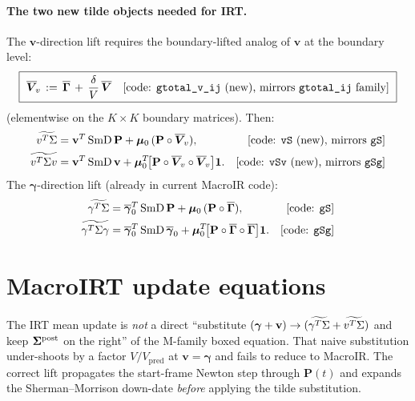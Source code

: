 \documentclass[11pt]{article}
\begin{document}
\paragraph{The two new tilde objects needed for IRT.}
The $\mathbf{v}$-direction lift requires the boundary-lifted analog of
$\mathbf{v}$ at the boundary level:
\begin{equation}
  \boxed{\
  \overline{\boldsymbol{V}}_{\!v} \,:=\, \overline{\boldsymbol{\Gamma}} \,+\, \frac{\delta}{V}\,\overline{\boldsymbol{V}}
  \quad\text{[code: \texttt{gtotal\_v\_ij} (new), mirrors \texttt{gtotal\_ij} family]}
  \ }
\end{equation}
(elementwise on the $K\!\times\! K$ boundary matrices). Then:
\begin{align}
  \widetilde{v^{T}\Sigma}
  &= \mathbf{v}^{T}\,\mathrm{SmD}\,\mathbf{P}
   + \boldsymbol{\mu}_0\,(\mathbf{P}\circ\overline{\boldsymbol{V}}_{\!v}),
   &\text{[code: \texttt{vS} (new), mirrors \texttt{gS}]}
   \label{eq:tilde_v_vec}\\
  \widetilde{v^{T}\Sigma v}
  &= \mathbf{v}^{T}\,\mathrm{SmD}\,\mathbf{v}
   + \boldsymbol{\mu}_0^{T}\!\bigl[\mathbf{P}\circ\overline{\boldsymbol{V}}_{\!v}\circ\overline{\boldsymbol{V}}_{\!v}\bigr]\mathbf{1}.
   &\text{[code: \texttt{vSv} (new), mirrors \texttt{gSg}]}
   \label{eq:tilde_v_v}
\end{align}
The $\boldsymbol{\gamma}$-direction lift (already in current MacroIR code):
\begin{align}
  \widetilde{\gamma^{T}\Sigma}
  &= \overline{\boldsymbol{\gamma}}_0^{T}\,\mathrm{SmD}\,\mathbf{P}
   + \boldsymbol{\mu}_0\,(\mathbf{P}\circ\overline{\boldsymbol{\Gamma}}),
   &\text{[code: \texttt{gS}]}\\
  \widetilde{\gamma^{T}\Sigma\gamma}
  &= \overline{\boldsymbol{\gamma}}_0^{T}\,\mathrm{SmD}\,\overline{\boldsymbol{\gamma}}_0
   + \boldsymbol{\mu}_0^{T}\!\bigl[\mathbf{P}\circ\overline{\boldsymbol{\Gamma}}\circ\overline{\boldsymbol{\Gamma}}\bigr]\mathbf{1}.
   &\text{[code: \texttt{gSg}]}
\end{align}

\section{MacroIRT update equations}

The IRT mean update is \emph{not} a direct ``substitute $(\boldsymbol{\gamma}+\mathbf{v}) \to (\widetilde{\gamma^{T}\Sigma} + \widetilde{v^{T}\Sigma})$ and keep $\boldsymbol{\Sigma}^{\mathrm{post}}$ on the right'' of the M-family boxed equation. That naive substitution under-shoots by a factor $V/V_{\mathrm{pred}}$ at $\mathbf{v}=\boldsymbol{\gamma}$ and fails to reduce to MacroIR. The correct lift propagates the start-frame Newton step through $\mathbf{P}(t)$ and expands the Sherman--Morrison down-date \emph{before} applying the tilde substitution.
\end{document}

